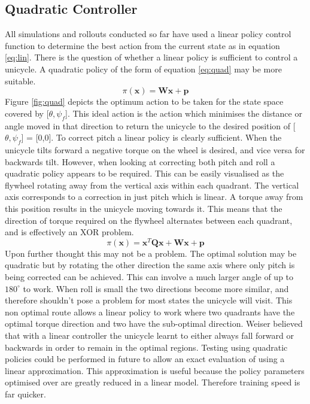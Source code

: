 \documentclass[twoside,twocolumn,12pt]{article}
\begin{document}
\subsection{Quadratic Controller}
All simulations and rollouts conducted so far have used a linear policy control function to determine the best action from the current state as in equation \ref{eq:lin}. There is the question of whether a linear policy is sufficient to control a unicycle. A quadratic policy of the form of equation \ref{eq:quad} may be more suitable.
\begin{equation}
\pi (\textbf{x}) = \textbf{Wx}+\textbf{p}
\label{eq:lin}
\end{equation}
Figure \ref{fig:quad} depicts the optimum action to be taken for the state space covered by [$\theta ,\psi_f$]. This ideal action is the action which minimises the distance or angle moved in that direction to return the unicycle to the desired position of [$\theta ,\psi_f$] = [0,0]. 
\newline
To correct pitch a linear policy is clearly sufficient. When the unicycle tilts forward a negative torque on the wheel is desired, and vice versa for backwards tilt. However, when looking at correcting both pitch and roll a quadratic policy appears to be required. This can be easily visualised as the flywheel rotating away from the vertical axis within each quadrant. The vertical axis corresponds to a correction in just pitch which is linear. A torque away from this position results in the unicycle moving towards it. This means that the direction of torque required on the flywheel alternates between each quadrant, and is effectively an XOR problem. \cite{roderigo} 
\begin{equation}
\pi (\textbf{x}) = \textbf{x}^T\textbf{Qx} + \textbf{Wx} + \textbf{p}
\label{eq:quad}
\end{equation}
Upon further thought this may not be a problem. The optimal solution may be quadratic but by rotating the other direction the same axis where only pitch is being corrected can be achieved. This can involve a much larger angle of up to $180^{\circ}$ to work. When roll is small the two directions become more similar, and therefore shouldn't pose a problem for most states the unicycle will visit. This non optimal route allows a linear policy to work where two quadrants have the optimal torque direction and two have the sub-optimal direction. Weiser believed that with a linear controller the unicycle learnt to either always fall forward or backwards in order to remain in the optimal regions. \cite{eric}
\newline
Testing using quadratic policies could be performed in future to allow an exact evaluation of using a linear approximation. This approximation is useful because the policy parameters optimised over are greatly reduced in a linear model. Therefore training speed is far quicker.
\end{document}
